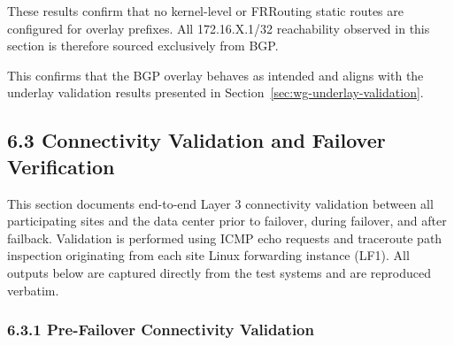 \documentclass[11pt]{article}
\begin{document}
These results confirm that no kernel-level or FRRouting static routes are configured for overlay prefixes. All 172.16.X.1/32 reachability observed in this section is therefore sourced exclusively from BGP.

This confirms that the BGP overlay behaves as intended and aligns with the underlay validation results presented in Section~\ref{sec:wg-underlay-validation}.

%
%
%
%
\subsection{6.3 Connectivity Validation and Failover Verification}
\label{sec:connectivity-validation}

This section documents end-to-end Layer 3 connectivity validation between all participating sites and the data center prior to failover, during failover, and after failback. Validation is performed using ICMP echo requests and traceroute path inspection originating from each site Linux forwarding instance (LF1). All outputs below are captured directly from the test systems and are reproduced verbatim.

%
%
%
\subsubsection{6.3.1 Pre-Failover Connectivity Validation}
\label{sec:pre-failover-validation}
\end{document}
